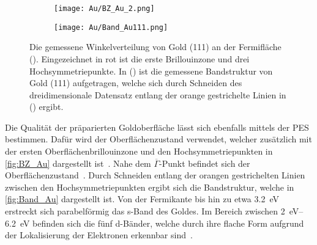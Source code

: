         \begin{figure}
            \centering
            \begin{subfigure}[t]{0.34\textwidth}
                \centering
                \texttt{[image: Au/BZ\_Au\_2.png]}
                \subcaption{}
                \label{fig:BZ_Au}
            \end{subfigure}
            \begin{subfigure}[t]{0.62\textwidth}
                \centering
                \texttt{[image: Au/Band\_Au111.png]}
                \subcaption{}
                \label{fig:Band_Au}
            \end{subfigure}
            \caption{Die gemessene Winkelverteilung von Gold (111) an der Fermifläche ().
            Eingezeichnet in rot ist die erste Brillouinzone und drei Hochsymmetriepunkte.
            In () ist die gemessene Bandstruktur von Gold (111) aufgetragen, welche sich durch Schneiden des dreidimensionale Datensatz entlang der orange gestrichelte Linien in () ergibt.}
        \end{figure}
        Die Qualität der präparierten Goldoberfläche lässt sich ebenfalls mittels der PES bestimmen.
        Dafür wird der Oberflächenzustand verwendet, welcher zusätzlich mit der ersten Oberflächenbrillouinzone und den Hochsymmetriepunkten in \autoref{fig:BZ_Au} dargestellt ist~\cite{Au_3}.
        Nahe dem $\overline{\Gamma}$-Punkt befindet sich der Oberflächenzustand~\cite{Au_1}.
        Durch Schneiden entlang der orangen gestrichelten Linien zwischen den Hochsymmetriepunkten ergibt sich die Bandstruktur, welche in \autoref{fig:Band_Au} dargestellt ist.
        Von der Fermikante bis hin zu etwa \SI{3.2}{\electronvolt} erstreckt sich parabelförmig das s-Band des Goldes.
        Im Bereich zwischen \SIrange{2}{6.2}{\electronvolt} befinden sich die fünf d-Bänder, welche durch ihre flache Form aufgrund der Lokalisierung der Elektronen erkennbar sind~\cite{yan_topological_2015}.


